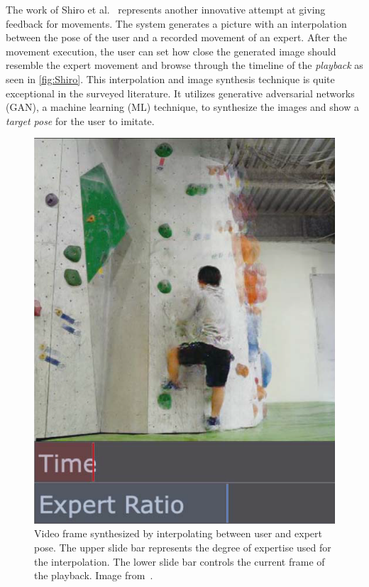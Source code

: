 The work of Shiro et al.~\cite{shiro2019ipv} represents another innovative attempt at giving feedback for movements. The system generates a picture with an interpolation between the pose of the user and a recorded movement of an expert. After the movement execution, the user can set how close the generated image should resemble the expert movement and browse through the timeline of the \emph{playback} as seen in \autoref{fig:Shiro}. This interpolation and image synthesis technique is quite exceptional in the surveyed literature. It utilizes generative adversarial networks (GAN), a machine learning (ML) technique, to synthesize the images and show a \emph{target pose} for the user to imitate.
\begin{figure}[ht]
    \includegraphics[width=\linewidth]{pictures/Shiro.png}
    \caption{Video frame synthesized by interpolating between user and expert pose. The upper slide bar represents the degree of expertise used for the interpolation. The lower slide bar controls the current frame of the playback. Image from~\cite{shiro2019ipv}.\label{fig:Shiro}}
\end{figure}

